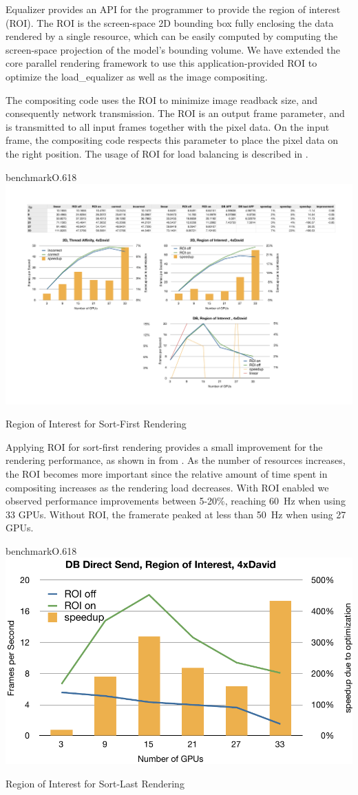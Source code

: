 Equalizer provides an API for the programmer to provide the region of interest
(ROI). The ROI is the screen-space 2D bounding box fully enclosing the data
rendered by a single resource, which can be easily computed by computing the
screen-space projection of the model's bounding volume. We have extended the
core parallel rendering framework to use this application-provided ROI to
optimize the \textsf{load\_equalizer} as well as the image compositing.

The compositing code uses the ROI to minimize image readback size, and
consequently network transmission. The ROI is an output frame parameter, and is
transmitted to all input frames together with the pixel data. On the input
frame, the compositing code respects this parameter to place the pixel data on
the right position. The usage of ROI for load balancing is described in
.

\begin{wrapfloat}{benchmark}{O}{.618\textwidth}
 \includegraphics[width=.618\textwidth]{results/roiSF}
 {\caption{\label{rROISF}Region of Interest for Sort-First Rendering}}
\end{wrapfloat}

Applying ROI for sort-first rendering provides a small improvement for the
rendering performance, as shown in  from \cite{EBAHMP:12}. As the
number of resources increases, the ROI becomes more important since the
relative amount of time spent in compositing increases as the rendering load
decreases. With ROI enabled we observed performance improvements between
5-20\%, reaching 60~Hz when using 33 GPUs. Without ROI, the framerate peaked at
less than 50~Hz when using 27 GPUs.

\begin{wrapfloat}{benchmark}{O}{.618\textwidth}
 \includegraphics[width=.618\textwidth]{results/roiSL}
 {\caption{\label{rROISL}Region of Interest for Sort-Last Rendering}}
\end{wrapfloat}

